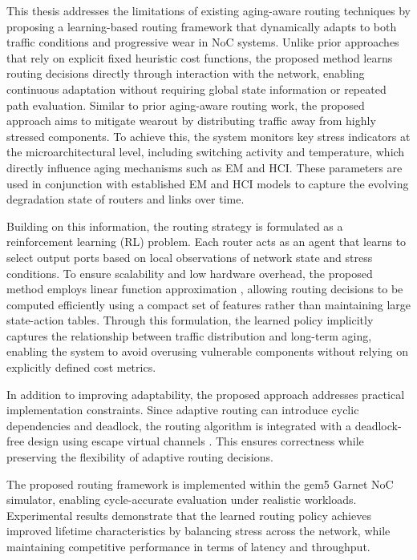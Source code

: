 This thesis addresses the limitations of existing aging-aware routing techniques by proposing a learning-based routing framework that dynamically adapts to both traffic conditions and progressive wear in NoC systems. Unlike prior approaches that rely on explicit fixed heuristic cost functions, the proposed method learns routing decisions directly through interaction with the network, enabling continuous adaptation without requiring global state information or repeated path evaluation. Similar to prior aging-aware routing work, the proposed approach aims to mitigate wearout by distributing traffic away from highly stressed components. To achieve this, the system monitors key stress indicators at the microarchitectural level, including switching activity and temperature, which directly influence aging mechanisms such as EM and HCI. These parameters are used in conjunction with established EM and HCI models to capture the evolving degradation state of routers and links over time.

Building on this information, the routing strategy is formulated as a reinforcement learning (RL) problem. Each router acts as an agent that learns to select output ports based on local observations of network state and stress conditions. To ensure scalability and low hardware overhead, the proposed method employs linear function approximation \cite{LARE2023}, allowing routing decisions to be computed efficiently using a compact set of features rather than maintaining large state-action tables. Through this formulation, the learned policy implicitly captures the relationship between traffic distribution and long-term aging, enabling the system to avoid overusing vulnerable components without relying on explicitly defined cost metrics.

In addition to improving adaptability, the proposed approach addresses practical implementation constraints. Since adaptive routing can introduce cyclic dependencies and deadlock, the routing algorithm is integrated with a deadlock-free design using escape virtual channels \cite{Duato1993}. This ensures correctness while preserving the flexibility of adaptive routing decisions.

The proposed routing framework is implemented within the gem5 Garnet NoC simulator, enabling cycle-accurate evaluation under realistic workloads. Experimental results demonstrate that the learned routing policy achieves improved lifetime characteristics by balancing stress across the network, while maintaining competitive performance in terms of latency and throughput.

